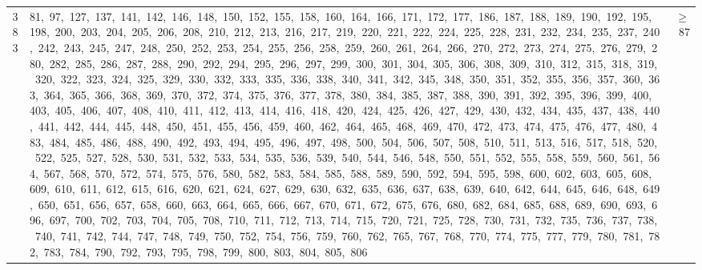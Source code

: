 \begin{longtable}{c|p{}|r}
383 & 81,\ 97,\ 127,\ 137,\ 141,\ 142,\ 146,\ 148,\ 150,\ 152,\ 155,\ 158,\ 160,\ 164,\ 166,\ 171,\ 172,\ 177,\ 186,\ 187,\ 188,\ 189,\ 190,\ 192,\ 195,\ 198,\ 200,\ 203,\ 204,\ 205,\ 206,\ 208,\ 210,\ 212,\ 213,\ 216,\ 217,\ 219,\ 220,\ 221,\ 222,\ 224,\ 225,\ 228,\ 231,\ 232,\ 234,\ 235,\ 237,\ 240,\ 242,\ 243,\ 245,\ 247,\ 248,\ 250,\ 252,\ 253,\ 254,\ 255,\ 256,\ 258,\ 259,\ 260,\ 261,\ 264,\ 266,\ 270,\ 272,\ 273,\ 274,\ 275,\ 276,\ 279,\ 280,\ 282,\ 285,\ 286,\ 287,\ 288,\ 290,\ 292,\ 294,\ 295,\ 296,\ 297,\ 299,\ 300,\ 301,\ 304,\ 305,\ 306,\ 308,\ 309,\ 310,\ 312,\ 315,\ 318,\ 319,\ 320,\ 322,\ 323,\ 324,\ 325,\ 329,\ 330,\ 332,\ 333,\ 335,\ 336,\ 338,\ 340,\ 341,\ 342,\ 345,\ 348,\ 350,\ 351,\ 352,\ 355,\ 356,\ 357,\ 360,\ 363,\ 364,\ 365,\ 366,\ 368,\ 369,\ 370,\ 372,\ 374,\ 375,\ 376,\ 377,\ 378,\ 380,\ 384,\ 385,\ 387,\ 388,\ 390,\ 391,\ 392,\ 395,\ 396,\ 399,\ 400,\ 403,\ 405,\ 406,\ 407,\ 408,\ 410,\ 411,\ 412,\ 413,\ 414,\ 416,\ 418,\ 420,\ 424,\ 425,\ 426,\ 427,\ 429,\ 430,\ 432,\ 434,\ 435,\ 437,\ 438,\ 440,\ 441,\ 442,\ 444,\ 445,\ 448,\ 450,\ 451,\ 455,\ 456,\ 459,\ 460,\ 462,\ 464,\ 465,\ 468,\ 469,\ 470,\ 472,\ 473,\ 474,\ 475,\ 476,\ 477,\ 480,\ 483,\ 484,\ 485,\ 486,\ 488,\ 490,\ 492,\ 493,\ 494,\ 495,\ 496,\ 497,\ 498,\ 500,\ 504,\ 506,\ 507,\ 508,\ 510,\ 511,\ 513,\ 516,\ 517,\ 518,\ 520,\ 522,\ 525,\ 527,\ 528,\ 530,\ 531,\ 532,\ 533,\ 534,\ 535,\ 536,\ 539,\ 540,\ 544,\ 546,\ 548,\ 550,\ 551,\ 552,\ 555,\ 558,\ 559,\ 560,\ 561,\ 564,\ 567,\ 568,\ 570,\ 572,\ 574,\ 575,\ 576,\ 580,\ 582,\ 583,\ 584,\ 585,\ 588,\ 589,\ 590,\ 592,\ 594,\ 595,\ 598,\ 600,\ 602,\ 603,\ 605,\ 608,\ 609,\ 610,\ 611,\ 612,\ 615,\ 616,\ 620,\ 621,\ 624,\ 627,\ 629,\ 630,\ 632,\ 635,\ 636,\ 637,\ 638,\ 639,\ 640,\ 642,\ 644,\ 645,\ 646,\ 648,\ 649,\ 650,\ 651,\ 656,\ 657,\ 658,\ 660,\ 663,\ 664,\ 665,\ 666,\ 667,\ 670,\ 671,\ 672,\ 675,\ 676,\ 680,\ 682,\ 684,\ 685,\ 688,\ 689,\ 690,\ 693,\ 696,\ 697,\ 700,\ 702,\ 703,\ 704,\ 705,\ 708,\ 710,\ 711,\ 712,\ 713,\ 714,\ 715,\ 720,\ 721,\ 725,\ 728,\ 730,\ 731,\ 732,\ 735,\ 736,\ 737,\ 738,\ 740,\ 741,\ 742,\ 744,\ 747,\ 748,\ 749,\ 750,\ 752,\ 754,\ 756,\ 759,\ 760,\ 762,\ 765,\ 767,\ 768,\ 770,\ 774,\ 775,\ 777,\ 779,\ 780,\ 781,\ 782,\ 783,\ 784,\ 790,\ 792,\ 793,\ 795,\ 798,\ 799,\ 800,\ 803,\ 804,\ 805,\ 806 & $\ge$ 87 \\

\end{longtable}
